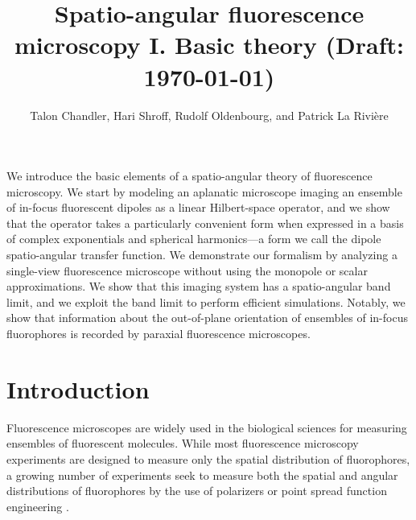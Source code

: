 \documentclass[]{osa-article}
\begin{document}
\title{Spatio-angular fluorescence microscopy I. Basic theory (Draft: \today)}

\author{Talon Chandler, Hari Shroff, Rudolf Oldenbourg, and Patrick La Rivi\`ere}

\address{University of Chicago, Department of Radiology, Chicago, Illinois 60637, USA\\
  Section on High Resolution Optical Imaging, National Institute
  of Biomedical Imaging and Bioengineering, National Institutes of Health,
  Bethesda, Maryland 20892, USA\\
  Marine Biological Laboratory, Bell Center, Woods Hole, Massachusetts 02543, USA
}




\begin{abstract*}
  We introduce the basic elements of a spatio-angular theory of fluorescence
  microscopy. We start by modeling an aplanatic microscope imaging an ensemble
  of in-focus fluorescent dipoles as a linear Hilbert-space operator, and we
  show that the operator takes a particularly convenient form when expressed in
  a basis of complex exponentials and spherical harmonics---a form we call the
  dipole spatio-angular transfer function. We demonstrate our formalism by
  analyzing a single-view fluorescence microscope without using the monopole or
  scalar approximations. We show that this imaging system has a spatio-angular
  band limit, and we exploit the band limit to perform efficient simulations.
  Notably, we show that information about the out-of-plane orientation of
  ensembles of in-focus fluorophores is recorded by paraxial fluorescence
  microscopes.
\end{abstract*}

\section{Introduction}
Fluorescence microscopes are widely used in the biological sciences for
measuring ensembles of fluorescent molecules. While most fluorescence microscopy
experiments are designed to measure only the spatial distribution of
fluorophores, a growing number of experiments seek to measure both the spatial
and angular distributions of fluorophores by the use of polarizers
\cite{vrabioiu2006, mattheyses2010, mehta2016, mcquilken2017, zhanghao2017} or
point spread function engineering \cite{agrawal2012, zhang2018}.
\end{document}
